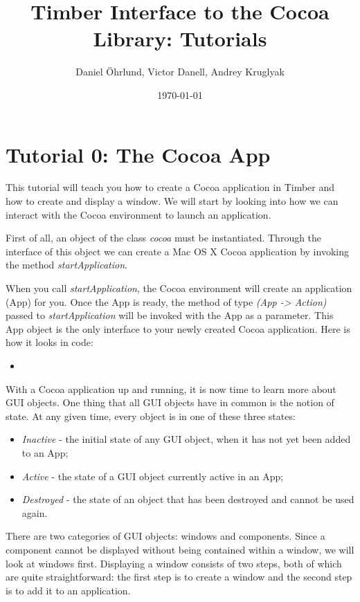 \documentclass[a4paper]{article}
\newcommand{\timbercode}[2]
  {\begin{itemize}\item[]\end{itemize}}
\begin{document}
\title{\vspace*{3cm} Timber Interface to the Cocoa Library: Tutorials}
\author {Daniel \"{O}hrlund, Victor Danell, Andrey Kruglyak}
\date{\today}
\maketitle
\thispagestyle{empty}

\newpage

\section*{Tutorial 0: The Cocoa App}
This tutorial will teach you how to create a Cocoa application in Timber and how to create and display a window. We will start by looking into how we can interact with the Cocoa environment to launch an application.

First of all, an object of the class \textit{cocoa} must be instantiated. Through the interface of this object we can create a Mac OS X Cocoa application by invoking the method \textit{startApplication}.

When you call \textit{startApplication}, the Cocoa environment will create an application (App) for you. Once the App is ready, the method of type \textit{(App -> Action)} passed to \textit{startApplication} will be invoked with the App as a parameter. This App object is the only interface to your newly created Cocoa application. Here is how it looks in code:

\timbercode{tutorial0part0}{}

With a Cocoa application up and running, it is now time to learn more about GUI objects. One thing that all GUI objects have in common is the notion of state. At any given time, every object is in one of these three states:
\begin{itemize}
\item\textit{Inactive} - the initial state of any GUI object, when it has not yet been added to an App;
\item\textit{Active} - the state of a GUI object currently active in an App;
\item\textit{Destroyed} - the state of an object that has been destroyed and cannot be used again.
\end{itemize}

There are two categories of GUI objects: windows and components. Since a component cannot be displayed without being contained within a window, we will look at windows first. Displaying a window consists of two steps, both of which are quite straightforward: the first step is to create a window and the second step is to add it to an application.
\end{document}
